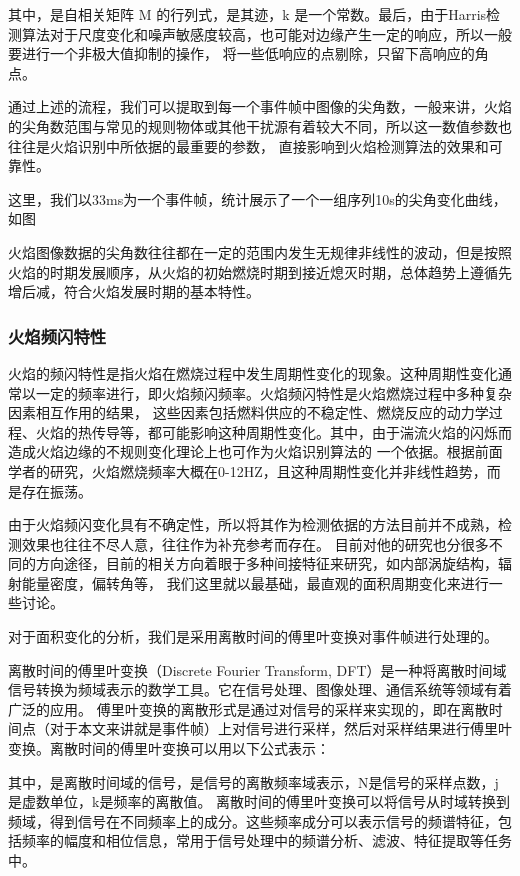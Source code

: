 其中，是自相关矩阵 M 的行列式，是其迹，k 是一个常数。最后，由于Harris检测算法对于尺度变化和噪声敏感度较高，也可能对边缘产生一定的响应，所以一般要进行一个非极大值抑制的操作，
将一些低响应的点剔除，只留下高响应的角点。

通过上述的流程，我们可以提取到每一个事件帧中图像的尖角数，一般来讲，火焰的尖角数范围与常见的规则物体或其他干扰源有着较大不同，所以这一数值参数也往往是火焰识别中所依据的最重要的参数，
直接影响到火焰检测算法的效果和可靠性。

这里，我们以33ms为一个事件帧，统计展示了一个一组序列10s的尖角变化曲线，如图

火焰图像数据的尖角数往往都在一定的范围内发生无规律非线性的波动，但是按照火焰的时期发展顺序，从火焰的初始燃烧时期到接近熄灭时期，总体趋势上遵循先增后减，符合火焰发展时期的基本特性。

\subsubsection{火焰频闪特性}
火焰的频闪特性是指火焰在燃烧过程中发生周期性变化的现象。这种周期性变化通常以一定的频率进行，即火焰频闪频率。火焰频闪特性是火焰燃烧过程中多种复杂因素相互作用的结果，
这些因素包括燃料供应的不稳定性、燃烧反应的动力学过程、火焰的热传导等，都可能影响这种周期性变化。其中，由于湍流火焰的闪烁而造成火焰边缘的不规则变化理论上也可作为火焰识别算法的
一个依据。根据前面学者的研究，火焰燃烧频率大概在0-12HZ，且这种周期性变化并非线性趋势，而是存在振荡。

由于火焰频闪变化具有不确定性，所以将其作为检测依据的方法目前并不成熟，检测效果也往往不尽人意，往往作为补充参考而存在。
目前对他的研究也分很多不同的方向途径，目前的相关方向着眼于多种间接特征来研究，如内部涡旋结构，辐射能量密度，偏转角等，
我们这里就以最基础，最直观的面积周期变化来进行一些讨论。

对于面积变化的分析，我们是采用离散时间的傅里叶变换对事件帧进行处理的。

离散时间的傅里叶变换（Discrete Fourier Transform, DFT）\cite{fly}是一种将离散时间域信号转换为频域表示的数学工具。它在信号处理、图像处理、通信系统等领域有着广泛的应用。
傅里叶变换的离散形式是通过对信号的采样来实现的，即在离散时间点（对于本文来讲就是事件帧）上对信号进行采样，然后对采样结果进行傅里叶变换。离散时间的傅里叶变换可以用以下公式表示：

其中，是离散时间域的信号，是信号的离散频率域表示，N是信号的采样点数，j是虚数单位，k是频率的离散值。
离散时间的傅里叶变换可以将信号从时域转换到频域，得到信号在不同频率上的成分。这些频率成分可以表示信号的频谱特征，包括频率的幅度和相位信息，常用于信号处理中的频谱分析、滤波、特征提取等任务中。

